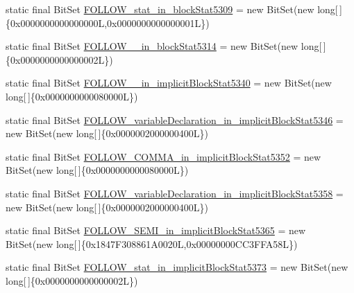\begin{DoxyCompactItemize}
\item 
static final Bit\-Set \hyperlink{classorg_1_1tzi_1_1use_1_1parser_1_1shell_1_1_shell_command_parser_acf715e49faa3009ea51a185169bdef1b}{F\-O\-L\-L\-O\-W\-\_\-stat\-\_\-in\-\_\-block\-Stat5309} = new Bit\-Set(new long\mbox{[}$\,$\mbox{]}\{0x0000000000000000\-L,0x0000000000000001\-L\})
\item 
static final Bit\-Set \hyperlink{classorg_1_1tzi_1_1use_1_1parser_1_1shell_1_1_shell_command_parser_a31446ffeb77925036f5d3811f237ac18}{F\-O\-L\-L\-O\-W\-\_\-\_\-in\-\_\-block\-Stat5314} = new Bit\-Set(new long\mbox{[}$\,$\mbox{]}\{0x0000000000000002\-L\})
\item 
static final Bit\-Set \hyperlink{classorg_1_1tzi_1_1use_1_1parser_1_1shell_1_1_shell_command_parser_ab7a818fe74567e0f3dee4ac04a09651a}{F\-O\-L\-L\-O\-W\-\_\-\_\-in\-\_\-implicit\-Block\-Stat5340} = new Bit\-Set(new long\mbox{[}$\,$\mbox{]}\{0x0000000000080000\-L\})
\item 
static final Bit\-Set \hyperlink{classorg_1_1tzi_1_1use_1_1parser_1_1shell_1_1_shell_command_parser_a24b62859592cc1d7acffce47abd53f29}{F\-O\-L\-L\-O\-W\-\_\-variable\-Declaration\-\_\-in\-\_\-implicit\-Block\-Stat5346} = new Bit\-Set(new long\mbox{[}$\,$\mbox{]}\{0x0000002000000400\-L\})
\item 
static final Bit\-Set \hyperlink{classorg_1_1tzi_1_1use_1_1parser_1_1shell_1_1_shell_command_parser_ac2adabc99d4e29e3670d0992770bfd59}{F\-O\-L\-L\-O\-W\-\_\-\-C\-O\-M\-M\-A\-\_\-in\-\_\-implicit\-Block\-Stat5352} = new Bit\-Set(new long\mbox{[}$\,$\mbox{]}\{0x0000000000080000\-L\})
\item 
static final Bit\-Set \hyperlink{classorg_1_1tzi_1_1use_1_1parser_1_1shell_1_1_shell_command_parser_a8e2100475630f1907135e8c89d865883}{F\-O\-L\-L\-O\-W\-\_\-variable\-Declaration\-\_\-in\-\_\-implicit\-Block\-Stat5358} = new Bit\-Set(new long\mbox{[}$\,$\mbox{]}\{0x0000002000000400\-L\})
\item 
static final Bit\-Set \hyperlink{classorg_1_1tzi_1_1use_1_1parser_1_1shell_1_1_shell_command_parser_a19bd8214beb730d3e69f899fd518b8af}{F\-O\-L\-L\-O\-W\-\_\-\-S\-E\-M\-I\-\_\-in\-\_\-implicit\-Block\-Stat5365} = new Bit\-Set(new long\mbox{[}$\,$\mbox{]}\{0x1847\-F308861\-A0020\-L,0x00000000\-C\-C3\-F\-F\-A58\-L\})
\item 
static final Bit\-Set \hyperlink{classorg_1_1tzi_1_1use_1_1parser_1_1shell_1_1_shell_command_parser_aab9d0cecc11634d93d331a365cf4d927}{F\-O\-L\-L\-O\-W\-\_\-stat\-\_\-in\-\_\-implicit\-Block\-Stat5373} = new Bit\-Set(new long\mbox{[}$\,$\mbox{]}\{0x0000000000000002\-L\})

\end{DoxyCompactItemize}
